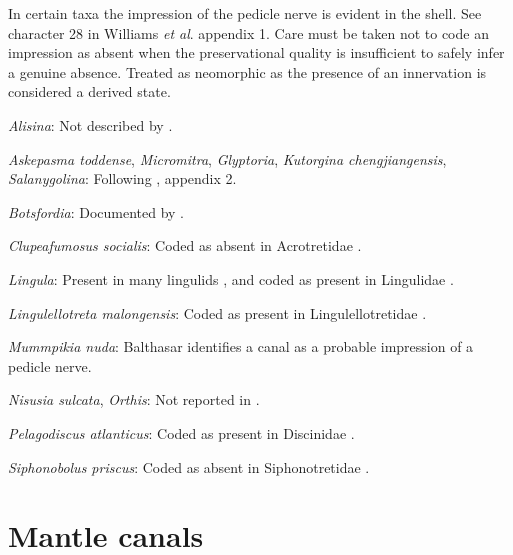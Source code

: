 \documentclass[openany]{book}
\begin{document}
In certain taxa the impression of the pedicle nerve is evident in the
shell. See character 28 in Williams \emph{et al}.
\citeyearpar{Williams1998Thediversity} appendix 1. Care must be taken
not to code an impression as absent when the preservational quality is
insufficient to safely infer a genuine absence. Treated as neomorphic as
the presence of an innervation is considered a derived state.

\hypertarget{Alisina-coding-34}{}
\emph{Alisina}: Not described by
\citet{Williams2000LinguliformeaCraniiformea}.

\hypertarget{Askepasma_toddense-coding-34}{}
\emph{Askepasma toddense}, \emph{Micromitra}, \emph{Glyptoria},
\emph{Kutorgina chengjiangensis}, \emph{Salanygolina}: Following
\citet{Williams1998Thediversity}, appendix 2.

\hypertarget{Botsfordia-coding-34}{}
\emph{Botsfordia}: Documented by \citet{Skovsted2017Depthrelated}.

\hypertarget{Clupeafumosus_socialis-coding-34}{}
\emph{Clupeafumosus socialis}: Coded as absent in Acrotretidae
\citep[table 6]{Williams2000LinguliformeaCraniiformea}.

\hypertarget{Lingula-coding-34}{}
\emph{Lingula}: Present in many lingulids
\citep{Williams2000LinguliformeaCraniiformea}, and coded as present in
Lingulidae \citep[table 6]{Williams2000LinguliformeaCraniiformea}.

\hypertarget{Lingulellotreta_malongensis-coding-34}{}
\emph{Lingulellotreta malongensis}: Coded as present in
Lingulellotretidae \citep[table
6]{Williams2000LinguliformeaCraniiformea}.

\hypertarget{Mummpikia_nuda-coding-34}{}
\emph{Mummpikia nuda}: Balthasar
\citeyearpar[p.~274]{Balthasar2008iMummpikia} identifies a canal as a
probable impression of a pedicle nerve.

\hypertarget{Nisusia_sulcata-coding-34}{}
\emph{Nisusia sulcata}, \emph{Orthis}: Not reported in
\citet{Williams2000LinguliformeaCraniiformea}.

\hypertarget{Pelagodiscus_atlanticus-coding-34}{}
\emph{Pelagodiscus atlanticus}: Coded as present in Discinidae
\citep[table 6]{Williams2000LinguliformeaCraniiformea}.

\hypertarget{Siphonobolus_priscus-coding-34}{}
\emph{Siphonobolus priscus}: Coded as absent in Siphonotretidae
\citep[table 6]{Williams2000LinguliformeaCraniiformea}.

\section{Mantle canals}\label{mantle-canals}
\end{document}
